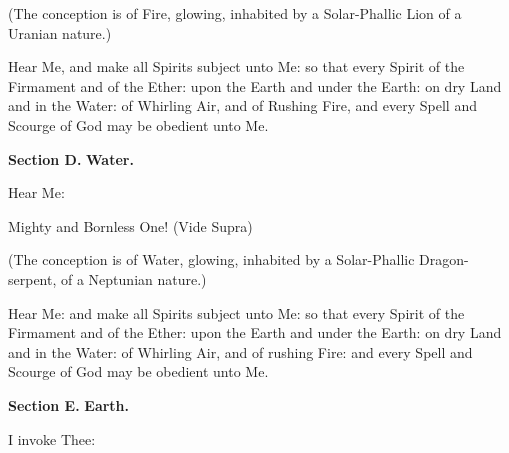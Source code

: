(The conception is of Fire, glowing, inhabited by a Solar-Phallic Lion of a Uranian nature.)

Hear Me, and make all Spirits subject unto Me: so that every Spirit of the Firmament and of the Ether: upon the Earth and under the Earth: on dry Land and in the Water:  of Whirling Air, and of Rushing Fire, and every Spell and Scourge of God may be obedient unto Me.

\textbf{Section D.} \hfill \textbf{Water.}

Hear Me: \textemdash{}











Mighty and Bornless One! (Vide Supra)

(The conception is of Water, glowing, inhabited by a Solar-Phallic Dragon-serpent, of a Neptunian nature.)

Hear Me: and make all Spirits subject unto Me: so that every Spirit of the Firmament and of the Ether: upon the Earth and under the Earth: on dry Land and in the Water: of Whirling Air, and of rushing Fire: and every Spell and Scourge of God may be obedient unto Me.

\textbf{Section E.} \hfill \textbf{Earth.}

I invoke Thee: \textemdash{}

